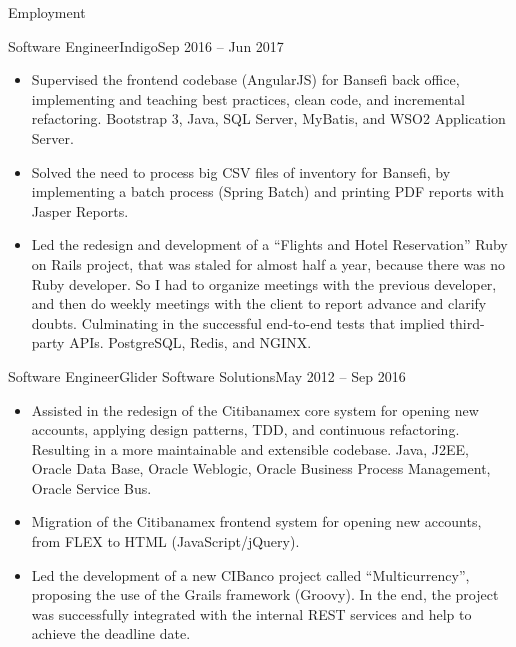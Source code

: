 \documentclass[calibri]{../macdowell-cv/mcdowellcv}
\begin{document}
\begin{cvsection}{Employment}
		\begin{cvsubsection}{Software Engineer}{Indigo}{Sep 2016 -- Jun 2017}		
			\begin{itemize}
				\item Supervised the frontend codebase (AngularJS) for Bansefi back office, implementing and teaching best practices, clean code, and incremental refactoring. Bootstrap 3, Java, SQL Server, MyBatis, and WSO2 Application Server.
				\item Solved the need to process big CSV files of inventory for Bansefi, by implementing a batch process (Spring Batch) and printing PDF reports with Jasper Reports.
				\item Led the redesign and development of a ``Flights and Hotel Reservation'' Ruby on Rails project, that was staled for almost half a year, because there was no Ruby developer. So I had to organize meetings with the previous developer, and then do weekly meetings with the client to report advance and clarify doubts. Culminating in the successful end-to-end tests that implied third-party APIs. PostgreSQL, Redis, and NGINX.
			\end{itemize}
		\end{cvsubsection}

        \pagebreak
		
		\begin{cvsubsection}{Software Engineer}{Glider Software Solutions}{May 2012 -- Sep 2016}	
			\begin{itemize}
				\item Assisted in the redesign of the Citibanamex core system for opening new accounts, applying design patterns, TDD, and continuous refactoring. Resulting in a more maintainable and extensible codebase. Java, J2EE, Oracle Data Base, Oracle Weblogic, Oracle Business Process Management, Oracle Service Bus.
				\item Migration of the Citibanamex frontend system for opening new accounts, from FLEX to HTML (JavaScript/jQuery).
				\item Led the development of a new CIBanco project called ``Multicurrency'', proposing the use of the Grails framework (Groovy). In the end, the project was successfully integrated with the internal REST services and help to achieve the deadline date.
			\end{itemize}
		\end{cvsubsection}


\end{cvsection}
\end{document}
